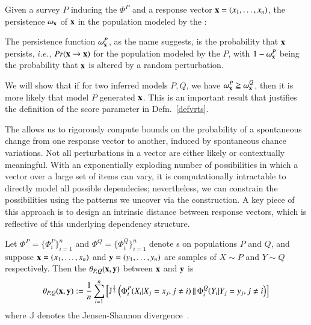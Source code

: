 \documentclass[onecolumn,10pt]{IEEEtran}
\begin{document}
% 
\begin{defn}\label{def:mem}
  Given a survey $P$ inducing the \qnet $\Phi^P$ and a response  vector $\bm{\mathrm{x}} = (x_1, \ldots, x_n)$, the persistence $\omega_{\bm{\mathrm{x}}}$ of  $\bm{\mathrm{x}}$ in the population modeled  by the \qnet:
\end{defn}
The persistence function $\omega_{\bm{\mathrm{x}}}^P$, as the name suggests,  is the probability that $\bm{\mathrm{x}}$ persists, $i.e.$,  $Pr(\bm{\mathrm{x}} \rightarrow \bm{\mathrm{x}})$ for the population modeled by the \qnet $P$, with $1-\omega_{\bm{\mathrm{x}}}^P$ being the probability that $\bm{\mathrm{x}}$ is altered by a  random perturbation.

We will show  that if for two inferred \qnet models $P,Q$, we have $\omega_{\bm{\mathrm{x}}}^P \geqq \omega_{\bm{\mathrm{x}}}^Q$, then it is more likely that model $P$ generated $\bm{\mathrm{x}}$. This is an important result that justifies the definition of the
score parameter in Defn.~\ref{defvrts}.



The \qnet allows us to rigorously compute  bounds on  the probability of a spontaneous change from one response vector to another, induced by spontaneous chance variations. Not all perturbations in a vector are either likely or contextually meaningful. With an exponentially exploding number of possibilities in which a vector over a large set of items can vary, it is computationally intractable to directly model all possible dependecies; nevertheless, we can constrain the possibilities using the patterns we uncover via the \qnet construction.  A key piece of this approach is to design  an intrinsic distance between response vectors, which is reflective of this underlying  dependency structure.  

\begin{defn}[\qdist]
  \label{defqdistance} 
  Let $\Phi^P = \{\Phi_i^P\}_{i=1}^n$ and $\Phi^Q = \{\Phi_i^Q\}_{i=1}^n$ denote {\qnet}s on populations $P$ and $Q$, and suppose $\bm{\mathrm{x}}=(x_1, \ldots, x_n)$ and $\bm{\mathrm{y}} =(y_1, \ldots, y_n)$ are samples of $X \sim P$ and $Y \sim Q$ respectively. Then the \qdist $\theta_{P,Q}(\bm{\mathrm{x}},\bm{\mathrm{y}})$ between $\bm{\mathrm{x}}$ and $\bm{\mathrm{y}}$ is\[\theta_{P,Q}(\bm{\mathrm{x}},\bm{\mathrm{y}}) := \frac{1}{n}\sum_{i=1}^n \left[ \mathbb{J}^{\frac{1}{2}} \left(\Phi_i^P(X_i |X_j = x_j, j \neq i) \,\|\, \Phi_i^Q(Y_i|Y_j = y_j, j \neq i\right ) \right]\]%
  where $\mathbb{J}$ denotes the Jensen-Shannon divergence~\cite{cover}.
\end{defn}
\end{document}
